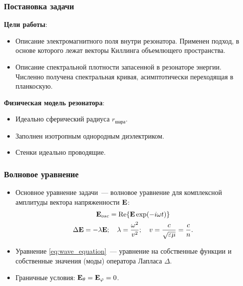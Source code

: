 \documentclass{beamer}
\begin{document}
    \begin{frame}\frametitle{Постановка задачи}

        \textbf{Цели работы}:
        \begin{itemize}
            \item Описание электромагнитного поля внутри резонатора.
                Применен подход, в основе которого лежат векторы Киллинга объемлющего пространства.
            \item Описание спектральной плотности запасенной в резонаторе энергии.
                Численно получена спектральная кривая, асимптотически переходящая в планкоскую.
        \end{itemize}

        \textbf{Физическая модель резонатора}:
        \begin{itemize}
            \item Идеально сферический радиуса $r_\text{шара}$.
            \item Заполнен изотропным однородным диэлектриком.
            \item Стенки идеально проводящие.
        \end{itemize}

    \end{frame}


    \begin{frame}\frametitle{Волновое уравнение}

        \begin{itemize}

            \item Основное уравнение задачи~--- волновое уравнение для комплексной амплитуды вектора напряженности $\mathbf{E}$:
            \begin{gather}
                \vb{E}_{osc} = \Re{\vb{E} \exp(-i \omega t)} \nonumber \\
                \Delta \mathbf{E} = - \lambda \mathbf{E} ; \quad
                    \lambda = \frac{\omega^2}{v^2} ; \quad
                    v = \frac{c}{\sqrt{\varepsilon\mu}} = \frac{c}{n} \label{eq:wave_equation}.
            \end{gather}

            \item Уравнение \autoref{eq:wave_equation}~--- уравнение на собственные функции и собственные значения (моды) оператора Лапласа $\Delta$.

            \item Граничные условия: $\vb{E}_\theta = \vb{E}_\varphi = 0$.

        \end{itemize}

    \end{frame}
\end{document}
